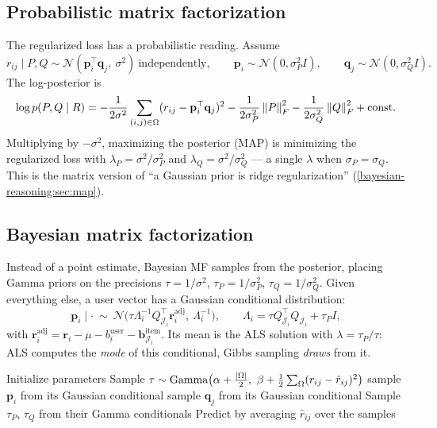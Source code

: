 \begin{notechapter}
\section{Probabilistic matrix factorization}\label{matrix-factorization:sec:pmf}

The regularized loss has a probabilistic reading. Assume
\[
  r_{ij}\mid P,Q\sim\mathcal N(\mathbf p_i^\top\mathbf q_j,\ \sigma^2)\ \text{independently},\qquad
  \mathbf p_i\sim\mathcal N(0,\sigma_P^2I),\qquad \mathbf q_j\sim\mathcal N(0,\sigma_Q^2I).
\]
The log-posterior is
\[
  \log p(P,Q\mid R) = -\frac1{2\sigma^2}\sum_{(i,j)\in\Omega}(r_{ij} - \mathbf p_i^\top\mathbf q_j)^2
  - \frac1{2\sigma_P^2}\left\|P\right\|_F^2 - \frac1{2\sigma_Q^2}\left\|Q\right\|_F^2 + \text{const}.
\]
Multiplying by $-\sigma^2$, maximizing the posterior (MAP) is minimizing the regularized loss with
$\lambda_P = \sigma^2/\sigma_P^2$ and $\lambda_Q = \sigma^2/\sigma_Q^2$ --- a single $\lambda$ when $\sigma_P = \sigma_Q$.
This is the matrix version of ``a Gaussian prior is ridge regularization''
(\cref{bayesian-reasoning:sec:map}).

\subsection{Bayesian matrix factorization}

Instead of a point estimate, Bayesian MF samples from the posterior, placing Gamma priors on the
precisions $\tau = 1/\sigma^2$, $\tau_P = 1/\sigma_P^2$, $\tau_Q = 1/\sigma_Q^2$. Given everything else, a user
vector has a Gaussian conditional distribution:
\[
  \mathbf p_i\mid\cdot\ \sim\ \mathcal N\bigl(\tau\Lambda_i^{-1}Q_{\mathcal J_i}^\top\mathbf r_i^{\text{adj}},\ \Lambda_i^{-1}\bigr),
  \qquad \Lambda_i = \tau Q_{\mathcal J_i}^\top Q_{\mathcal J_i} + \tau_PI,
\]
with $\mathbf r_i^{\text{adj}} = \mathbf r_i - \mu - b_i^{\text{user}} - \mathbf b^{\text{item}}_{\mathcal J_i}$. Its mean is the ALS
solution with $\lambda = \tau_P/\tau$: ALS computes the \emph{mode} of this conditional, Gibbs sampling
\emph{draws} from it.

\begin{center}
\begin{minipage}{0.85\linewidth}
\begin{algorithm}[H]
\caption{Gibbs sampling for Bayesian MF}
\begin{algorithmic}[1]
\State Initialize parameters
  \State Sample $\tau\sim\mathrm{Gamma}\bigl(\alpha + \frac{\left|\Omega\right|}2,\ \beta + \frac12\sum_{\Omega}(r_{ij} - \hat r_{ij})^2\bigr)$
   \State sample $\mathbf p_i$ from its Gaussian conditional \EndFor
   \State sample $\mathbf q_j$ from its Gaussian conditional \EndFor
  \State Sample $\tau_P$, $\tau_Q$ from their Gamma conditionals
\EndFor
\State Predict by averaging $\hat r_{ij}$ over the samples
\end{algorithmic}
\end{algorithm}
\end{minipage}
\end{center}


\end{notechapter}
